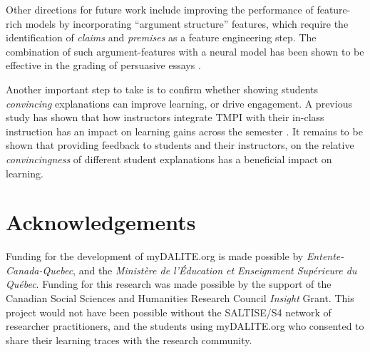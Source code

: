 \documentclass[notitlepage,12pt]{jedm}
\begin{document}
Other directions for future work include improving the performance of 
feature-rich models by incorporating ``argument structure'' features, which 
require the identification of \textit{claims} and \textit{premises} as a 
feature engineering step.
The combination of such argument-features with a neural model has been shown to 
be effective in the grading of persuasive essays \cite{nguyen_argument_2018}.

Another important step to take is to confirm whether showing students 
\textit{convincing} explanations can improve learning, or drive engagement. 
A previous study has shown that how instructors integrate TMPI with their 
in-class instruction has an impact on learning gains across the semester 
\cite{bhatnagar_analysis_2015}. 
It remains to be shown that providing feedback to students and their 
instructors, on the relative \textit{convincingness} of different student 
explanations has a beneficial impact on learning.




\section{Acknowledgements}
Funding for the development of myDALITE.org is made possible by 
\textit{Entente-Canada-Quebec}, and the \textit{Ministère de l'Éducation et 
Enseignment Supérieure du Québec}. Funding for this research was made possible 
by the support of the Canadian Social Sciences and Humanities Research Council 
\textit{Insight} Grant. This project would not have been possible without the 
SALTISE/S4 network of researcher practitioners, and the students using 
myDALITE.org who consented to share their learning traces with the research 
community.

 




\end{document}

